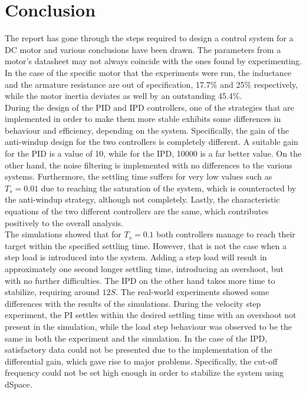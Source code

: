 \section{Conclusion}

The report has gone through the steps required to design a control system for a DC motor and various conclusions have been drawn. The parameters from a motor's datasheet may not always coincide with the ones found by experimenting. In the case of the specific motor that the experiments were run, the inductance and the armature resistance are out of specification, 17.7\% and 25\% respectively, while the motor inertia deviates as well by an outstanding 45.4\%. 
\\

During the design of the PID and IPD controllers, one of the strategies that are implemented in order to make them more stable exhibits some differences in behaviour and efficiency, depending on the system. Specifically, the gain of the anti-windup design for the two controllers is completely different. A suitable gain for the PID is a value of 10, while for the IPD, 10000 is a far better value. On the other hand, the noise filtering is implemented with no differences to the various systems. Furthermore, the settling time suffers for very low values such as $T_s=0.01$ due to reaching the saturation of the system, which is counteracted by the anti-windup strategy, although not completely. Lastly, the characteristic equations of the two different controllers are the same, which contributes positively to the overall analysis.
\\

The simulations showed that for $T_s=0.1$ both controllers manage to reach their target within the specified settling time. 
However, that is not the case when a step load is introduced into the system. 
Adding a step load will result in approximately one second longer settling time, introducing an overshoot, but with no further difficulties. 
The IPD on the other hand takes more time to stabilize, requiring around $12S$. 
The real-world experiments showed some differences with the results of the simulations. 
During the velocity step experiment, the PI settles within the desired settling time with an overshoot not present in the simulation, while the load step behaviour was observed to be the same in both the experiment and the simulation. 
In the case of the IPD, satisfactory data could not be presented due to the implementation of the differential gain, which gave rise to major problems. Specifically, the cut-off frequency could not be set high enough in order to stabilize the system using dSpace.